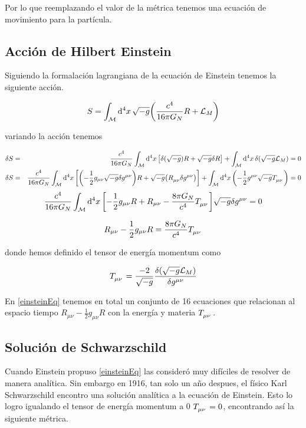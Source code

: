 \documentclass[../Main.tex]{subfiles}
\begin{document}
Por lo que reemplazando el valor de la métrica tenemos una ecuación de movimiento para la partícula.

\subsection{Acción de Hilbert Einstein}
Siguiendo la formalación lagrangiana de la ecuación de Einstein tenemos la siguiente acción.

\begin{equation}
    S = \int_{\mathcal{M}}\dd[4]{x}\sqrt{-g}\qty(\dfrac{c^{4}}{16\pi G_{N}}R+\mathcal{L}_{M})
\end{equation}

variando la acción tenemos

\begin{eqnarray*}
    \delta S = && \dfrac{c^{4}}{16\pi G_{N}} \int_{\mathcal{M}}\dd[4]{x}\qty[\delta(\sqrt{-g})R+\sqrt{-g}\delta R]+\int_{\mathcal{M}}\dd[4]{x}\delta(\sqrt{-g}\mathcal{L}_{M}) = 0 \\
    \delta S = && \dfrac{c^{4}}{16\pi G_{N}} \int_{\mathcal{M}}\dd[4]{x}\qty[\qty(-\frac{1}{2}g_{\mu\nu}\sqrt{-g}\delta g^{\mu\nu})R + \sqrt{-g}\qty(\tensor{R}{_{\mu\nu}}\delta g^{\mu\nu})]+\int_{\mathcal{M}}\dd[4]{x}\qty(-\frac{1}{2}g^{\mu\nu}\sqrt{-g}\tensor{T}{_{\mu\nu}})= 0
\end{eqnarray*}
\begin{equation}
    \dfrac{c^{4}}{16\pi G_{N}} \int_{\mathcal{M}}\dd[4]{x}\qty[-\frac{1}{2}g_{\mu\nu}R+R_{\mu\nu}-\frac{8\pi G_{N}}{c^{4}}\tensor{T}{_{\mu\nu}}]\sqrt{-g}\delta g^{\mu\nu} = 0
\end{equation}

\begin{equation}
    R_{\mu\nu} - \frac{1}{2}g_{\mu\nu}R = \frac{8\pi G_{N}}{c^{4}}\tensor{T}{_{\mu\nu}}
    \label{einsteinEq}
\end{equation}

donde hemos definido el tensor de energía momentum como

\begin{equation}
    \tensor{T}{_{\mu\nu}} = \dfrac{-2}{\sqrt{-g}}\fdv{(\sqrt{-g}\mathcal{L}_{M})}{g^{\mu\nu}}
\end{equation}

En \eqref{einsteinEq} tenemos en total un conjunto de 16 ecuaciones que relacionan al espacio tiempo $R_{\mu\nu} - \frac{1}{2}g_{\mu\nu}R$ con la energía y materia $\tensor{T}{_{\mu\nu}}$.

\subsection{Solución de Schwarzschild}
Cuando Einstein propuso \eqref{einsteinEq} las consideró muy difíciles de resolver de manera analítica. Sin embargo en 1916, tan solo un año despues, el físico Karl Schwarzschild encontro una solución analítica a la ecuación de Einstein. Esto lo logro igualando el tensor de energía momentum a 0 $\tensor{T}{_{\mu\nu}}=0$, encontrando así la siguiente métrica.
\end{document}
